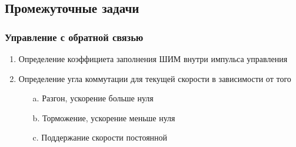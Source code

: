 \subsection{Промежуточные задачи}

\subsubsection{Управление с обратной связью}
\begin{enumerate}
    \item Определение коэффициета заполнения ШИМ внутри импульса управления
    \item Определение угла коммутации для текущей скорости в зависимости от того
    \begin{itemize}
        \item[a. ] Разгон, ускорение больше нуля
        \item[b. ] Торможение, ускорение меньше нуля
        \item[c. ] Поддержание скорости постоянной
    \end{itemize}
\end{enumerate}

\newpage
